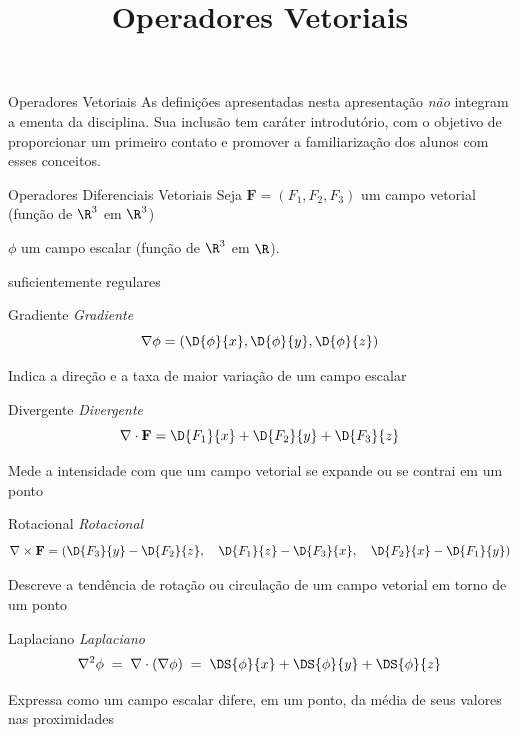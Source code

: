 \documentclass[fleqn,utf8,aspectratio=169,12pt]{beamer}
\title{Operadores Vetoriais}
\begin{document}
\addtitle

\begin{frame}{Operadores Vetoriais}
  As definições apresentadas nesta apresentação \emph{não} integram a ementa
  da disciplina. Sua inclusão tem caráter introdutório,
  com o objetivo de proporcionar um primeiro contato e promover a
  familiarização dos alunos com esses conceitos.
\end{frame}

\begin{frame}{Operadores Diferenciais Vetoriais}
  Seja $\mathbf{F} = (F_1, F_2, F_3)$ um campo vetorial (função de $\R^3$ em $\R^3$)

  \medskip
  $\phi$ um campo escalar (função de $\R^3$ em $\R$).

  \medskip
  suficientemente regulares
\end{frame}

\begin{frame}{Gradiente}
  \emph{Gradiente}
  \[
    \nabla \phi
    = \left( \D{\phi}{x},
             \D{\phi}{y},
             \D{\phi}{z}
      \right)
  \]

  Indica a direção e a taxa de maior variação de um campo escalar
\end{frame}

\begin{frame}{Divergente}
  \emph{Divergente}
  \[
    \nabla \cdot \mathbf{F}
      = \D{F_1}{x}
      + \D{F_2}{y}
      + \D{F_3}{z}
  \]

  Mede a intensidade com que um campo vetorial se expande ou se contrai
  em um ponto
\end{frame}

\begin{frame}{Rotacional}
\emph{Rotacional}
  \[
    \nabla \times \mathbf{F} =
    \left(
    \D{F_3}{y} - \D{F_2}{z},\quad
    \D{F_1}{z} - \D{F_3}{x},\quad
    \D{F_2}{x} - \D{F_1}{y}
    \right)
  \]

  Descreve a tendência de rotação ou circulação de um campo vetorial
  em torno de um ponto
\end{frame}

\begin{frame}{Laplaciano}
  \emph{Laplaciano}
  \[
    \nabla^2 \phi
    \;=\; \nabla \cdot (\nabla \phi)
    \;=\; \DS{\phi}{x} + \DS{\phi}{y} + \DS{\phi}{z}
  \]

  Expressa como um campo escalar difere, em um ponto,
  da média de seus valores nas proximidades
\end{frame}

\end{document}
